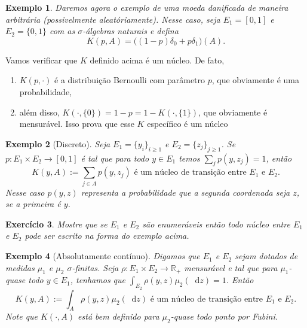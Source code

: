 \documentclass[reqno]{article}
\newcommand*\1{\mathds{1}}
\newtheorem{example}{Exemplo}[section]
\newtheorem{exercise}[example]{Exercício}
\renewcommand*\d{\mathop{}\!\mathrm{d}}
\begin{document}
\begin{example}
  \label{x:moeda_danificada}
  Daremos agora o exemplo de uma moeda danificada de maneira arbitrária (possivelmente aleatóriamente).
  Nesse caso, seja $E_1 = [0,1]$ e $E_2 = \{0,1\}$ com as $\sigma$-álgebras naturais e defina
  \begin{equation}
    K(p, A) = \big( (1-p)\delta_0 + p \delta_1 \big) (A).
  \end{equation}
\end{example}

Vamos verificar que $K$ definido acima é um núcleo.
De fato,
\begin{enumerate}[\quad i)]
\item $K(p, \cdot)$ é a distribuição Bernoulli com parâmetro $p$, que obviamente é uma probabilidade,
\item além disso, $K(\cdot, \{0\}) = 1-p = 1 - K(\cdot,\{1\})$, que obviamente é mensurável.
Isso prova que esse $K$ específico é um núcleo
\end{enumerate}

\begin{example}[Discreto]
  \label{x:nucleo_discreto}
  Seja $E_1 = \{y_i\}_{i \geq 1}$ e $E_2 = \{z_j\}_{j \geq 1}$.
  Se $p: E_1 \times E_2 \to [0,1]$ é tal que para todo $y \in E_1$ temos $\sum_{j} p(y, z_j) = 1$, então
  \begin{equation}
    K(y, A) := \sum_{j \in A} p(y, z_j) \text{ é um núcleo de transição entre $E_1$ e $E_2$.}
  \end{equation}
  Nesse caso $p(y,z)$ representa a probabilidade que a segunda coordenada seja $z$, se a primeira é $y$.
\end{example}

\begin{exercise}
  Mostre que se $E_1$ e $E_2$ são enumeráveis então todo núcleo entre $E_1$ e $E_2$ pode ser escrito na forma do exemplo acima.
\end{exercise}

\begin{example}[Absolutamente contínuo]
  Digamos que $E_1$ e $E_2$ sejam dotados de medidas $\mu_1$ e $\mu_2$ $\sigma$-finitas.
  Seja $\rho: E_1 \times E_2 \to \mathbb{R}_+$ mensurável e tal que para $\mu_1$-quase todo $y \in E_1$, tenhamos que $\int_{E_2} \rho(y, z) \mu_2(\d z) = 1$.
  Então
  \begin{equation}
    K(y, A) := \int_A \rho(y, z) \mu_2(\d z) \text{ é um núcleo de transição entre $E_1$ e $E_2$.}
  \end{equation}
  Note que $K(\cdot, A)$ está bem definido para $\mu_2$-quase todo ponto por Fubini.
\end{example}
\end{document}
